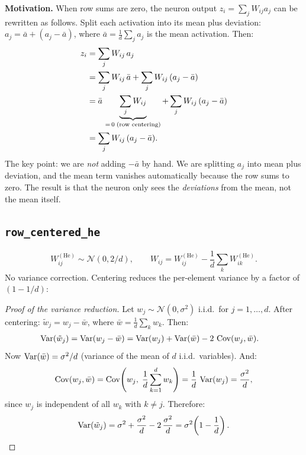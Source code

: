 \textbf{Motivation.}  When row sums are zero, the neuron output
$z_i = \sum_j W_{ij} a_j$ can be rewritten as follows.
Split each activation into its mean plus deviation:
$a_j = \bar{a} + (a_j - \bar{a})$, where
$\bar{a} = \frac{1}{d}\sum_j a_j$ is the mean activation.
Then:
\begin{align}
  z_i &= \sum_j W_{ij}\, a_j \notag \\
      &= \sum_j W_{ij}\,\bar{a}
         + \sum_j W_{ij}\,(a_j - \bar{a}) \notag \\
      &= \bar{a}\,\underbrace{\sum_j W_{ij}}_{= \,0\;\text{(row centering)}}
         + \sum_j W_{ij}\,(a_j - \bar{a}) \notag \\
      &= \sum_j W_{ij}\,(a_j - \bar{a}).
  \label{eq:rc_motivation}
\end{align}
The key point: we are \emph{not} adding $-\bar{a}$ by hand.
We are splitting $a_j$ into mean plus deviation, and the mean term
vanishes automatically because the row sums to zero.
The result is that the neuron only sees the \emph{deviations} from
the mean, not the mean itself.

\subsection{\texttt{row\_centered\_he}}

\begin{equation}
  W_{ij}^{(\mathrm{He})} \sim \mathcal{N}(0, 2/d),
  \qquad
  W_{ij} = W_{ij}^{(\mathrm{He})} - \frac{1}{d}\sum_{k} W_{ik}^{(\mathrm{He})}.
\end{equation}
No variance correction.  Centering reduces the per-element variance by
a factor of $(1 - 1/d)$:

\begin{proof}[Proof of the variance reduction]
Let $w_j \sim \mathcal{N}(0, \sigma^2)$ i.i.d.\ for $j = 1,\dots,d$.
After centering: $\tilde{w}_j = w_j - \bar{w}$, where
$\bar{w} = \frac{1}{d}\sum_k w_k$.  Then:
\begin{align*}
  \operatorname{Var}(\tilde{w}_j)
  &= \operatorname{Var}(w_j - \bar{w})
  = \operatorname{Var}(w_j) + \operatorname{Var}(\bar{w}) - 2\,\operatorname{Cov}(w_j, \bar{w}).
\end{align*}
Now $\operatorname{Var}(\bar{w}) = \sigma^2/d$ (variance of the mean of $d$
i.i.d.\ variables).  And:
\[
  \operatorname{Cov}(w_j, \bar{w})
  = \operatorname{Cov}\!\left(w_j,\; \frac{1}{d}\sum_{k=1}^{d} w_k\right)
  = \frac{1}{d}\,\operatorname{Var}(w_j)
  = \frac{\sigma^2}{d},
\]
since $w_j$ is independent of all $w_k$ with $k \neq j$.
Therefore:
\[
  \operatorname{Var}(\tilde{w}_j)
  = \sigma^2 + \frac{\sigma^2}{d} - 2\,\frac{\sigma^2}{d}
  = \sigma^2\!\left(1 - \frac{1}{d}\right).
  \qedhere
\]
\end{proof}

